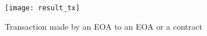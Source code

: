 \begin{figure}[H]
    \centering
    \texttt{[image: result\_tx]}
    \caption{Transaction made by an EOA to an EOA or a contract~\cite{preethi}}
    \label{fig:tx_accounts}
\end{figure}